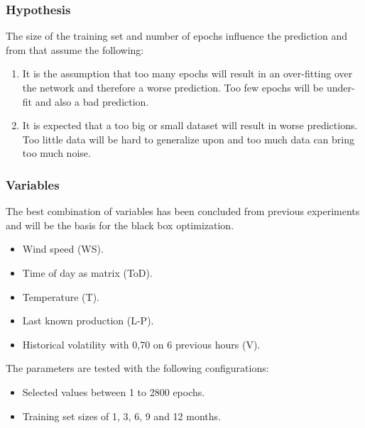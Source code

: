 \subsubsection{Hypothesis}
The size of the training set and number of epochs influence the prediction and from that assume the following:
\begin{enumerate}
\item It is the assumption that too many epochs will result in an over-fitting over the network and therefore a worse prediction. Too few epochs will be under-fit and also a bad prediction.
\item It is expected that a too big or small dataset will result in worse predictions. Too little data will be hard to generalize upon and too much data can bring too much noise.
\end{enumerate}

\subsubsection{Variables}
The best combination of variables has been concluded from previous experiments and will be the basis for the black box optimization. 

\begin{itemize}
\item Wind speed (WS).
\item Time of day as matrix (ToD).
\item Temperature (T).
\item Last known production (L-P).
\item Historical volatility with 0,70 on 6 previous hours (V).
\end{itemize}

The parameters are tested with the following configurations:

\begin{itemize}
\item Selected values between 1 to 2800 epochs.
\item Training set sizes of 1, 3, 6, 9 and 12 months.
\end{itemize}

